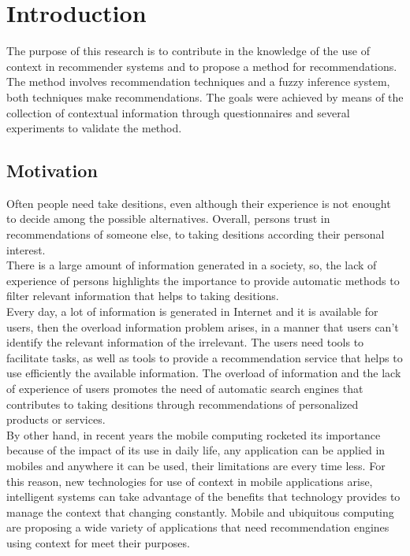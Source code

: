 \chapter{Introduction} \label{introduction} 

The purpose of this research is to contribute in the knowledge of the
use of context in recommender systems and to propose a method
for recommendations. The method involves recommendation techniques and a fuzzy inference system, both techniques make recommendations.
The goals were achieved by means of the collection of contextual
information through questionnaires and several experiments to validate the method.

\section{Motivation}

Often people need take desitions, even although their experience is
not enought to decide among the possible alternatives. Overall,
persons trust in recommendations of someone else, to taking desitions
according their personal interest.\\
There is a large amount of information generated in a society, so, the
lack of experience of persons highlights the importance to provide
automatic methods to filter relevant information that helps to taking
desitions. \\Every day, a lot of information is generated in Internet
and it is available for users, then the overload information problem
arises, in a manner that users can't identify the relevant information
of the irrelevant. The users need tools to facilitate tasks, as well
as tools to provide a recommendation service that helps to use
efficiently the available information. The overload of information and
the lack of experience of users promotes the need of automatic search
engines that contributes to taking desitions through recommendations
of personalized products or services. \\ By other hand, in recent
years  the mobile computing rocketed its importance because of the
impact of its use in daily life, any application can be applied in
mobiles and anywhere it can be used, their limitations are every time
less. For this reason, new technologies for use of context in mobile
applications arise, intelligent systems can take advantage of the
benefits that technology provides to manage the context that changing
constantly. Mobile and ubiquitous computing\cite{noguera2012mobile}
\cite{chiou2010adaptive} are proposing a wide variety of applications
that need recommendation engines using context for meet their
purposes.


